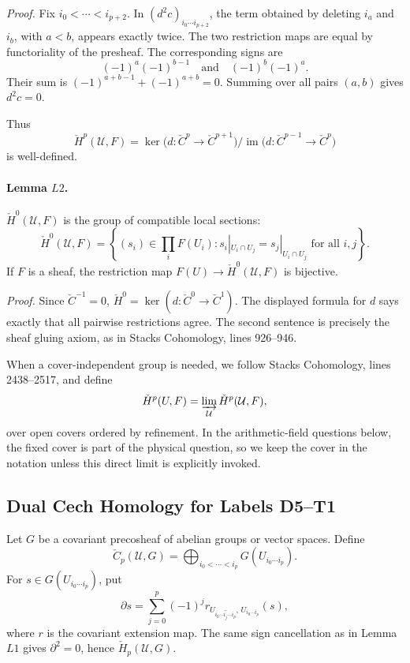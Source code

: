 \emph{Proof.}
Fix \(i_0<\cdots<i_{p+2}\).  In \((d^2c)_{i_0\cdots i_{p+2}}\), the term
obtained by deleting \(i_a\) and \(i_b\), with \(a<b\), appears exactly twice.
The two restriction maps are equal by functoriality of the presheaf.  The
corresponding signs are
\[
  (-1)^a(-1)^{b-1}
  \quad\text{and}\quad
  (-1)^b(-1)^a .
\]
Their sum is \((-1)^{a+b-1}+(-1)^{a+b}=0\).  Summing over all pairs
\((a,b)\) gives \(d^2c=0\).

Thus
\[
  \check H^p(\mathcal U,F)
  =
  \ker\bigl(d:\check C^p\to\check C^{p+1}\bigr)/
  \operatorname{im}\bigl(d:\check C^{p-1}\to\check C^p\bigr)
\]
is well-defined.

\paragraph{Lemma \(L2\).}
\(\check H^0(\mathcal U,F)\) is the group of compatible local sections:
\[
  \check H^0(\mathcal U,F)
  =
  \left\{(s_i)\in\prod_iF(U_i):
  s_i|_{U_i\cap U_j}=s_j|_{U_i\cap U_j}\text{ for all }i,j\right\}.
\]
If \(F\) is a sheaf, the restriction map \(F(U)\to\check H^0(\mathcal U,F)\)
is bijective.

\emph{Proof.}
Since \(\check C^{-1}=0\), \(\check H^0=\ker(d:\check C^0\to\check C^1)\).
The displayed formula for \(d\) says exactly that all pairwise restrictions
agree.  The second sentence is precisely the sheaf gluing axiom, as in
Stacks Cohomology, lines 926--946.

When a cover-independent group is needed, we follow Stacks Cohomology,
lines 2438--2517, and define
\[
  \check H^p(U,F)=
  \varinjlim_{\mathcal U}\check H^p(\mathcal U,F),
\]
over open covers ordered by refinement.  In the arithmetic-field questions
below, the fixed cover is part of the physical question, so we keep the cover
in the notation unless this direct limit is explicitly invoked.

\subsection{Dual Cech Homology for Labels D5--T1}

Let \(G\) be a covariant precosheaf of abelian groups or vector spaces.  Define
\[
  \check C_p(\mathcal U,G)=
  \bigoplus_{i_0<\cdots<i_p}G(U_{i_0\cdots i_p}).
\]
For \(s\in G(U_{i_0\cdots i_p})\), put
\[
  \partial s=
  \sum_{j=0}^p(-1)^j
  r_{U_{i_0\cdots\widehat{i_j}\cdots i_p},\,U_{i_0\cdots i_p}}(s),
\]
where \(r\) is the covariant extension map.  The same sign cancellation as in
Lemma \(L1\) gives \(\partial^2=0\), hence \(\check H_p(\mathcal U,G)\).

